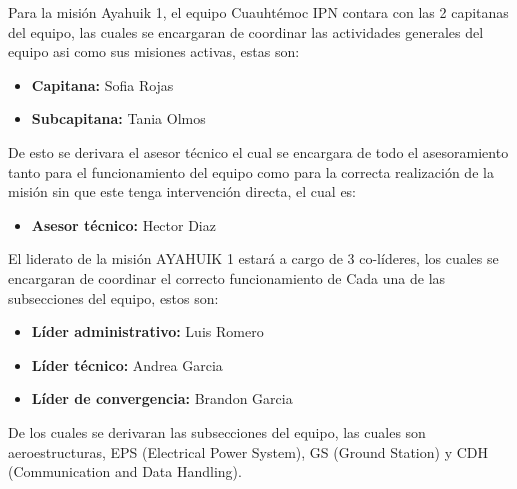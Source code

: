 \documentclass[letterpaper,12pt]{article} %
\begin{document}
    Para la misión Ayahuik 1, el equipo Cuauhtémoc IPN contara con las 2 capitanas del equipo, 
    las cuales se encargaran de coordinar las actividades generales del equipo asi como sus misiones activas, 
    estas son:

    \begin{itemize}
        \item \textbf{Capitana:} Sofia Rojas
        \item \textbf{Subcapitana:} Tania Olmos
    
    \end{itemize}

    De esto se derivara el asesor técnico el cual se encargara de todo el asesoramiento tanto para el funcionamiento del equipo
    como para la correcta realización de la misión sin que este tenga intervención directa, el cual es:

    \begin{itemize}
        \item \textbf{Asesor técnico:} Hector Diaz

    \end{itemize}

    El liderato de la misión AYAHUIK 1 estará a cargo de 3 co-líderes,
    los cuales se encargaran de coordinar el correcto funcionamiento de Cada
    una de las subsecciones del equipo, estos son:

    \begin{itemize}
        \item \textbf{Líder administrativo:} Luis Romero
        \item \textbf{Líder técnico:} Andrea Garcia
        \item \textbf{Líder de convergencia:} Brandon Garcia
    
    \end{itemize}

    De los cuales se derivaran las subsecciones del equipo, las cuales son aeroestructuras, EPS (Electrical Power System), GS (Ground Station) y CDH (Communication and Data Handling).
\end{document}
